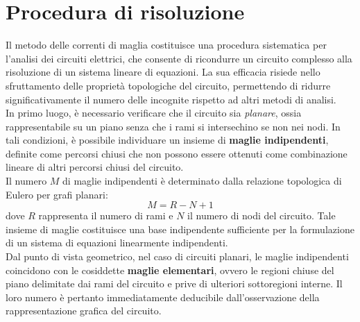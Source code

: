 \section{Procedura di risoluzione}
Il metodo delle correnti di maglia costituisce una procedura sistematica per l'analisi dei circuiti elettrici, che consente di ricondurre un circuito complesso alla risoluzione di un sistema lineare di equazioni. La sua efficacia risiede nello sfruttamento delle proprietà topologiche del circuito, permettendo di ridurre significativamente il numero delle incognite rispetto ad altri metodi di analisi.\\

In primo luogo, è necessario verificare che il circuito sia \emph{planare}, ossia rappresentabile su un piano senza che i rami si intersechino se non nei nodi. In tali condizioni, è possibile individuare un insieme di \textbf{maglie indipendenti}, definite come percorsi chiusi che non possono essere ottenuti come combinazione lineare di altri percorsi chiusi del circuito.\\

Il numero \(M\) di maglie indipendenti è determinato dalla relazione topologica di Eulero per grafi planari:
\begin{equation}
    M = R - N + 1
    \label{eq:topologia}
\end{equation}
dove \(R\) rappresenta il numero di rami e \(N\) il numero di nodi del circuito. Tale insieme di maglie costituisce una base indipendente sufficiente per la formulazione di un sistema di equazioni linearmente indipendenti.\\

Dal punto di vista geometrico, nel caso di circuiti planari, le maglie indipendenti coincidono con le cosiddette \textbf{maglie elementari}, ovvero le regioni chiuse del piano delimitate dai rami del circuito e prive di ulteriori sottoregioni interne. Il loro numero è pertanto immediatamente deducibile dall'osservazione della rappresentazione grafica del circuito.



\begin{center}
\end{center}


